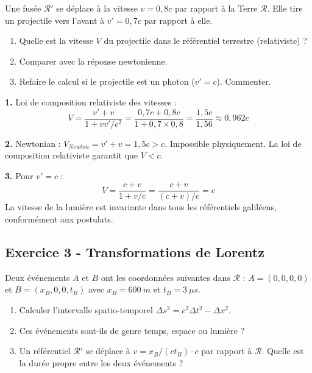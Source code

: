 \documentclass[12pt,a4paper]{article}
\begin{document}
\begin{boiteexercice}
Une fusée $\mathcal{R}'$ se déplace à la vitesse $v = 0{,}8c$ par rapport à la Terre $\mathcal{R}$. Elle tire un projectile vers l'avant à $v' = 0{,}7c$ par rapport à elle.
\begin{enumerate}
  \item Quelle est la vitesse $V$ du projectile dans le référentiel terrestre (relativiste) ?
  \item Comparer avec la réponse newtonienne.
  \item Refaire le calcul si le projectile est un photon ($v' = c$). Commenter.
\end{enumerate}
\end{boiteexercice}

\begin{boitecorrige}
\textbf{1.} Loi de composition relativiste des vitesses :
\[
V = \frac{v' + v}{1 + vv'/c^2} = \frac{0{,}7c + 0{,}8c}{1 + 0{,}7\times0{,}8} = \frac{1{,}5c}{1{,}56} \approx 0{,}962c
\]

\textbf{2.} Newtonian : $V_{Newton} = v' + v = 1{,}5c > c$. Impossible physiquement. La loi de composition relativiste garantit que $V < c$.

\textbf{3.} Pour $v' = c$ :
\[
V = \frac{c + v}{1 + v/c} = \frac{c + v}{(c+v)/c} = c
\]
La vitesse de la lumière est invariante dans tous les référentiels galiléens, conformément aux postulats.
\end{boitecorrige}

\subsection*{Exercice 3 - Transformations de Lorentz \niveau{\moyen}}

\begin{boiteexercice}
Deux événements $A$ et $B$ ont les coordonnées suivantes dans $\mathcal{R}$ : $A = (0,0,0,0)$ et $B = (x_B, 0, 0, t_B)$ avec $x_B = \qty{600}{m}$ et $t_B = \qty{3}{\mu s}$.
\begin{enumerate}
  \item Calculer l'intervalle spatio-temporel $\Delta s^2 = c^2\Delta t^2 - \Delta x^2$.
  \item Ces événements sont-ils de genre temps, espace ou lumière ?
  \item Un référentiel $\mathcal{R}'$ se déplace à $v = x_B/(ct_B)\cdot c$ par rapport à $\mathcal{R}$. Quelle est la durée propre entre les deux événements ?
\end{enumerate}
\end{boiteexercice}
\end{document}
